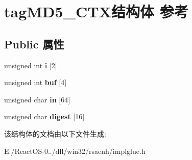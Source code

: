 \hypertarget{structtag_m_d5___c_t_x}{}\section{tag\+M\+D5\+\_\+\+C\+T\+X结构体 参考}
\label{structtag_m_d5___c_t_x}
\subsection*{Public 属性}
\begin{DoxyCompactItemize}
\item 
\mbox{\label{structtag_m_d5___c_t_x_adac7e2e8562eb570013c53fb65274a93}} 
unsigned int {\bfseries i} \mbox{[}2\mbox{]}
\item 
\mbox{\label{structtag_m_d5___c_t_x_a03dc60037169ea5ba3c4fb2503ec52d9}} 
unsigned int {\bfseries buf} \mbox{[}4\mbox{]}
\item 
\mbox{\label{structtag_m_d5___c_t_x_a4935e894f0cca69d624f0571dd698764}} 
unsigned char {\bfseries in} \mbox{[}64\mbox{]}
\item 
\mbox{\label{structtag_m_d5___c_t_x_a0324260514aaab429304c41831104d02}} 
unsigned char {\bfseries digest} \mbox{[}16\mbox{]}
\end{DoxyCompactItemize}


该结构体的文档由以下文件生成\+:\begin{DoxyCompactItemize}
\item 
E\+:/\+React\+O\+S-\/0../dll/win32/rsaenh/implglue.\+h\end{DoxyCompactItemize}
